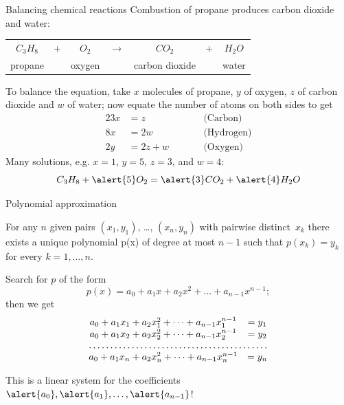 \documentclass%
[handout]%
{beamer}
\begin{document}
\begin{frame}[label=linear-example2]{Balancing chemical reactions}
Combustion of propane produces carbon dioxide  and water:
\begin{block}{}
\begin{tabular}{ccccccc}
  $C_3H_8$ & + & $O_2$ &$\rightarrow$& $CO_2$ & + & $H_2O$\\
  propane && oxygen &&carbon dioxide&&water
\end{tabular}
\end{block}
To balance the equation, take \alert{$x$} molecules of propane, \alert{$y$} of oxygen, \alert{$z$} of carbon dioxide and \alert{$w$} of water; now equate the number of atoms on both sides to get
\begin{alignat*}{2}
  3x &= z &\qquad &\text{(Carbon)}\\
  8x &= 2w &\qquad &\text{(Hydrogen)}\\
  2y &= 2z+w&\qquad &\text{(Oxygen)}
\end{alignat*}
Many solutions, e.g. $x=1$, $y=5$, $z=3$, and $w=4$:
\[
    C_3H_8 + \alert{5}O_2 = \alert{3}CO_2 + \alert{4}H_2O
\]
\end{frame}


\begin{frame}[label=linear-example3]{Polynomial approximation}

\begin{theorem}
  For any $n$ given pairs $(x_1,y_1)$, \dots, $(x_n,y_n)$ with pairwise distinct~$x_k$ there exists a unique polynomial p(x) of degree at most $n-1$ such that $p(x_k) = y_k$ for every $k=1,\dots,n$.
\end{theorem}

Search for $p$ of the form
\[
    p(x) = a_0 + a_1 x + a_2 x^2 + \dots + a_{n-1}x^{n-1};
\]
then we get
\[
\begin{matrix}
    a_0 + a_1 x_1+ a_2 x_1^2 + \dots + a_{n-1}x_1^{n-1} &= y_1\\
    a_0 + a_1 x_2+ a_2 x_2^2 + \dots + a_{n-1}x_2^{n-1} &= y_2\\
    \hdotsfor{2}\\
    a_0 + a_1 x_n+ a_2 x_n^2 + \dots + a_{n-1}x_n^{n-1} &= y_n
\end{matrix}
\]

This is a linear system for the coefficients $\alert{a_0}, \alert{a_1}, \dots, \alert{a_{n-1}}$!
\end{frame}
\end{document}
